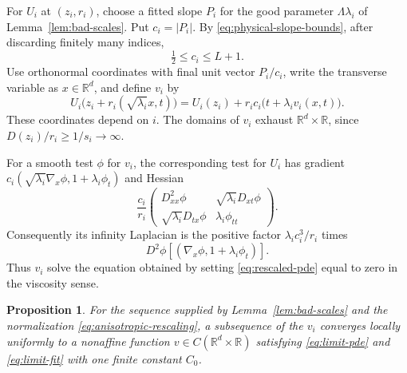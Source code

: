 \documentclass[11pt]{article}
\numberwithin{equation}{section}
\newtheorem{proposition}[theorem]{Proposition}
\theoremstyle{definition}
\theoremstyle{remark}
\newcommand{\R}{\mathbb{R}}
\begin{document}
For $U_i$ at $(z_i,r_i)$, choose a fitted slope $P_i$ for the good parameter $\Lambda\lambda_i$ of Lemma~\ref{lem:bad-scales}. Put $c_i=|P_i|$. By \eqref{eq:physical-slope-bounds}, after discarding finitely many indices,
\begin{equation}\label{eq:base-norm-bounds}
  \tfrac12\le c_i\le L+1.
\end{equation}
Use orthonormal coordinates with final unit vector $P_i/c_i$, write the transverse variable as $x\in\R^d$, and define $v_i$ by
\begin{equation}\label{eq:anisotropic-rescaling}
  U_i\bigl(z_i+r_i(\sqrt{\lambda_i}x,t)\bigr)
   =U_i(z_i)+r_i c_i\bigl(t+\lambda_i v_i(x,t)\bigr).
\end{equation}
These coordinates depend on $i$. The domains of $v_i$ exhaust $\R^d\times\R$, since $D(z_i)/r_i\ge1/s_i\to\infty$.

For a smooth test $\phi$ for $v_i$, the corresponding test for $U_i$ has gradient $c_i(\sqrt{\lambda_i}\nabla_x\phi,1+\lambda_i\phi_t)$ and Hessian
\[
  \frac{c_i}{r_i}
  \begin{pmatrix}
    D^2_{xx}\phi&\sqrt{\lambda_i}D_{xt}\phi\\
    \sqrt{\lambda_i}D_{tx}\phi&\lambda_i\phi_{tt}
  \end{pmatrix}.
\]
Consequently its infinity Laplacian is the positive factor $\lambda_i c_i^3/r_i$ times
\begin{equation}\label{eq:rescaled-pde}
  D^2\phi[(\nabla_x\phi,1+\lambda_i\phi_t)].
\end{equation}
Thus $v_i$ solve the equation obtained by setting \eqref{eq:rescaled-pde} equal to zero in the viscosity sense.

\begin{proposition}\label{prop:nonaffine-limit}
For the sequence supplied by Lemma~\ref{lem:bad-scales} and the normalization \eqref{eq:anisotropic-rescaling}, a subsequence of the $v_i$ converges locally uniformly to a nonaffine function $v\in C(\R^d\times\R)$ satisfying \eqref{eq:limit-pde} and \eqref{eq:limit-fit} with one finite constant $C_0$.
\end{proposition}
\end{document}
